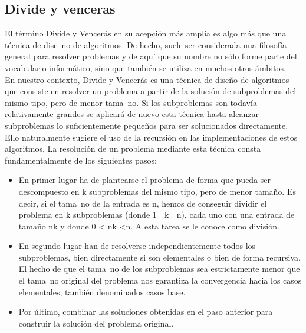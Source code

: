 \documentclass[12pt,twoside]{article}
\begin{document}
\subsection{Divide y venceras}
El t\'ermino Divide y Vencer\'as en su acepci\'on m\'as amplia es algo m\'as que una
t\'ecnica de dise~no de algoritmos. De hecho, suele ser considerada una filosof\'ia
general para resolver problemas y de aqu\'i que su nombre no s\'olo forme parte del
vocabulario inform\'atico, sino que tambi\'en se utiliza en muchos otros \'ambitos. \\
En nuestro contexto, Divide y Vencer\'as es una t\'ecnica de diseño de algoritmos que consiste en resolver un problema a partir de la soluci\'on de subproblemas del mismo tipo, pero de menor tama~no. Si los subproblemas son
todav\'ia relativamente grandes se aplicar\'a de nuevo esta t\'ecnica hasta alcanzar
subproblemas lo suficientemente pequeños para ser solucionados directamente.
Ello naturalmente sugiere el uso de la recursi\'on en las implementaciones de
estos algoritmos. La resoluci\'on de un problema mediante esta t\'ecnica consta
fundamentalmente de los siguientes pasos:
\begin{itemize}
    \item En primer lugar ha de plantearse el problema de forma que pueda ser
descompuesto en k subproblemas del mismo tipo, pero de menor tamaño.
Es decir, si el tama~no de la entrada es n, hemos de conseguir dividir el
problema en k subproblemas (donde 1  k  n), cada uno con una
entrada de tamaño nk y donde 0 < nk <n. A esta tarea se le conoce
como divisi\'on.
\item En segundo lugar han de resolverse independientemente todos los subproblemas,
bien directamente si son elementales o bien de forma recursiva.
El hecho de que el tama~no de los subproblemas sea estrictamente
menor que el tama~no original del problema nos garantiza la convergencia
hacia los casos elementales, tambi\'en denominados casos base.
\item Por \'ultimo, combinar las soluciones obtenidas en el paso anterior para
construir la soluci\'on del problema original.
\end{itemize}
\end{document}
